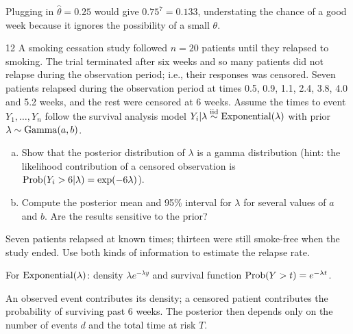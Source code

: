 \documentclass[11pt]{article}
\begin{document}
\begin{takeaway}
Plugging in $\hat\theta=0.25$ would give $0.75^7=0.133$, understating the chance of a good week because it ignores the possibility of a small $\theta$.
\end{takeaway}


\begin{problem}{12}
A smoking cessation study followed $n=20$ patients until they relapsed to smoking. The trial terminated after six weeks and so many patients did not relapse during the observation period; i.e., their responses was censored. Seven patients relapsed during the observation period at times 0.5, 0.9, 1.1, 2.4, 3.8, 4.0 and 5.2 weeks, and the rest were censored at 6 weeks. Assume the times to event $Y_1,\dots,Y_n$ follow the survival analysis model $Y_i|\lambda\stackrel{\text{iid}}{\sim}\mathrm{Exponential}(\lambda)$ with prior $\lambda\sim\mathrm{Gamma}(a,b)$.
\begin{enumerate}[(a)]
\item Show that the posterior distribution of $\lambda$ is a gamma distribution (hint: the likelihood contribution of a censored observation is $\mathrm{Prob}(Y_i>6|\lambda)=\exp(-6\lambda)$).
\item Compute the posterior mean and 95\% interval for $\lambda$ for several values of $a$ and $b$. Are the results sensitive to the prior?
\end{enumerate}
\end{problem}

\begin{restate}
Seven patients relapsed at known times; thirteen were still smoke-free when the study ended. Use both kinds of information to estimate the relapse rate.
\end{restate}

\begin{recall}
For $\mathrm{Exponential}(\lambda)$: density $\lambda e^{-\lambda y}$ and survival function $\mathrm{Prob}(Y>t)=e^{-\lambda t}$.
\end{recall}

\begin{keyidea}
An observed event contributes its density; a censored patient contributes the probability of surviving past 6 weeks. The posterior then depends only on the number of events $d$ and the total time at risk $T$.
\end{keyidea}
\end{document}
